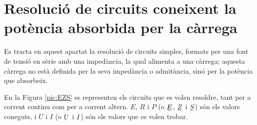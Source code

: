\section{Resoluci\'{o} de circuits coneixent la pot\`{e}ncia absorbida per la c\`{a}rrega}

Es tracta en aquest apartat la resoluci\'{o} de circuits simples,
formats per una font de tensi\'{o} en s\`{e}rie amb una imped\`{a}ncia, la qual
alimenta a una c\`{a}rrega; aquesta c\`{a}rrega no est\`{a} definida per la seva
imped\`{a}ncia o admit\`{a}ncia, sin\'{o} per la pot\`{e}ncia que absorbeix.

En la Figura \vref{pic:EZS} es representen els circuits que es volen
resoldre, tant per a corrent continu com per a corrent altern. $E$,
$R$ i $P$ (o $\cmplx{E}$, $\cmplx{Z}$ i $\cmplx{S}$) s\'{o}n els valors
coneguts, i $U$ i $I$ (o $\cmplx{U}$ i $\cmplx{I}$) s\'{o}n els valors
que es volen trobar.
